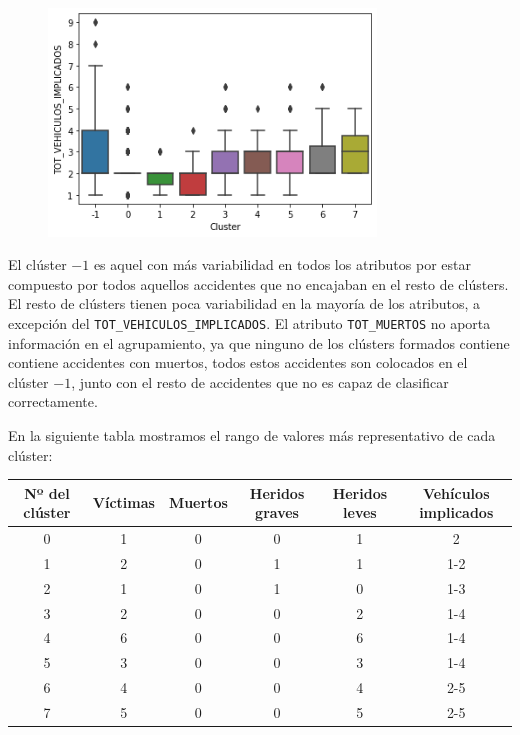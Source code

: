 \documentclass[a4]{article}
\begin{document}
\begin{figure}[H]
  \includegraphics[width=87mm]{imagenes/c2_dbscan_vi}
\end{figure}

El clúster $-1$ es aquel con más variabilidad en todos los atributos por estar compuesto por todos aquellos accidentes que no encajaban en el resto de clústers. El resto de clústers tienen poca variabilidad en la mayoría de los atributos, a excepción del \texttt{TOT\_VEHICULOS\_IMPLICADOS}. El atributo \texttt{TOT\_MUERTOS} no aporta información en el agrupamiento, ya que ninguno de los clústers formados contiene contiene accidentes con muertos, todos estos accidentes son colocados en el clúster $-1$, junto con el resto de accidentes que no es capaz de clasificar correctamente.

\newpage
En la siguiente tabla mostramos el rango de valores más representativo de cada clúster:

\begin{center}
\begin{tabular}{|c|c|c|c|c|c|}
\hline
\multicolumn{1}{|c|}{\textbf{Nº del clúster}} & \textbf{Víctimas} & \textbf{Muertos} & \textbf{Heridos graves} & \textbf{Heridos leves} & \textbf{Vehículos implicados}\\ \hline
  0  & 1 & 0 & 0 & 1 & 2   \\ \hline
  1  & 2 & 0 & 1 & 1 & 1-2 \\ \hline
  2  & 1 & 0 & 1 & 0 & 1-3 \\ \hline
  3  & 2 & 0 & 0 & 2 & 1-4 \\ \hline
  4  & 6 & 0 & 0 & 6 & 1-4 \\ \hline
  5  & 3 & 0 & 0 & 3 & 1-4 \\ \hline
  6  & 4 & 0 & 0 & 4 & 2-5 \\ \hline
  7  & 5 & 0 & 0 & 5 & 2-5 \\ \hline
\end{tabular}
\end{center}
\end{document}
